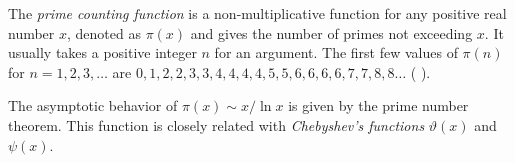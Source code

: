 \documentclass[12pt]{article}
\begin{document}
The {\it prime counting function} is a non-multiplicative function for any positive real number $x$, denoted as $\pi(x)$ and gives the number of primes not exceeding $x$. It usually takes a positive integer $n$ for an argument. The first few values of $\pi(n)$ for $n = 1, 2, 3, \ldots $ are $0, 1, 2, 2, 3, 3, 4, 4, 4, 4, 5, 5, 6, 6, 6, 6, 7, 7, 8, 8 \ldots $ (
).

The asymptotic behavior of $\pi(x) \sim x/\ln x$ is given by the prime number theorem. This function is closely related with {\it Chebyshev's functions} $\vartheta(x)$ and $\psi(x)$.
\end{document}

